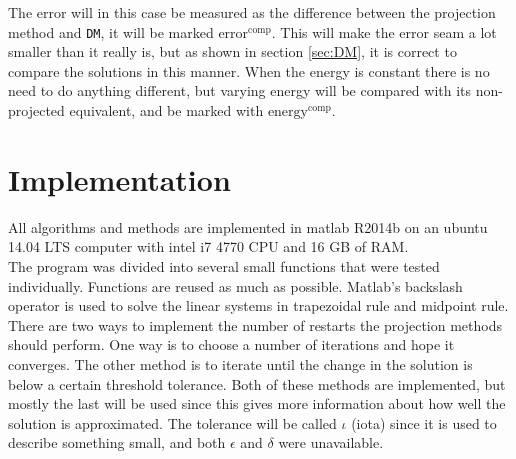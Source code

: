 \noindent The error will in this case be measured as the difference between the projection method and \texttt{DM}, it will be marked $\text{error}^{\text{comp}}$. This will make the error seam a lot smaller than it really is, but as shown in section \ref{sec:DM}, it is correct to compare the solutions in this manner. When the energy is constant there is no need to do anything different, but varying energy will be compared with its non-projected equivalent, and be marked with $\text{energy}^{\text{comp}}$.

\section{Implementation} %
\label{sec:praktisk}
All algorithms and methods are implemented in matlab R2014b on an ubuntu 14.04 LTS computer with intel i7 4770 CPU and 16 GB of RAM. \\
The program was divided into several small functions that were tested individually. Functions are reused as much as possible.
Matlab's backslash operator is used to solve the linear systems in trapezoidal rule and midpoint rule. \\

\noindent There are two ways to implement the number of restarts the projection methods should perform. One way is to choose a number of iterations and hope it converges. The other method is to iterate until the change in the solution is below a certain threshold tolerance. Both of these methods are implemented, but mostly the last will be used since this gives more information about how well the solution is approximated. The tolerance will be called $\iota$ (iota) since it is used to describe something small\cite{iota}, and both $\epsilon$ and $\delta$ were unavailable.


